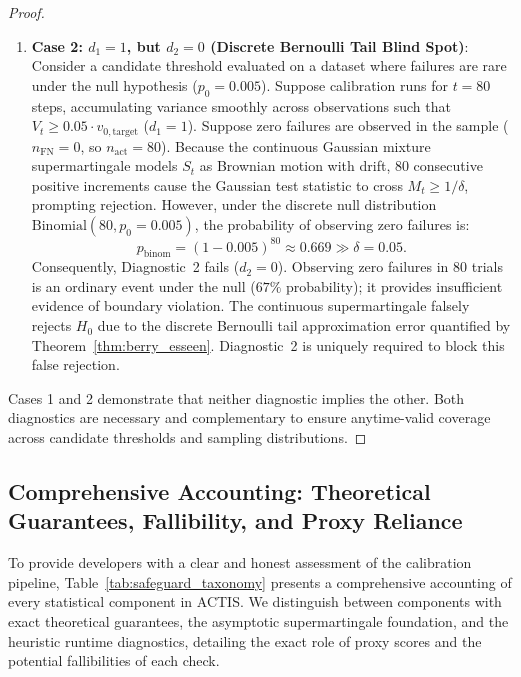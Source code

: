 \documentclass[11pt,a4paper]{article}
\begin{document}
\begin{proof}
\begin{enumerate}[leftmargin=*]
    \item \textbf{Case 2: $d_1 = 1$, but $d_2 = 0$ (Discrete Bernoulli Tail Blind Spot)}:
    Consider a candidate threshold evaluated on a dataset where failures are rare under the null hypothesis ($p_0 = 0.005$).
    Suppose calibration runs for $t = 80$ steps, accumulating variance smoothly across observations such that $V_t \ge 0.05 \cdot v_{0, \text{target}}$ ($d_1 = 1$).
    Suppose zero failures are observed in the sample ($n_{\text{FN}} = 0$, so $n_{\text{act}} = 80$).
    Because the continuous Gaussian mixture supermartingale models $S_t$ as Brownian motion with drift, 80 consecutive positive increments cause the Gaussian test statistic to cross $M_t \ge 1/\delta$, prompting rejection.
    However, under the discrete null distribution $\text{Binomial}(80, p_0 = 0.005)$, the probability of observing zero failures is:
    \begin{equation}
    p_{\text{binom}} = (1 - 0.005)^{80} \approx 0.669 \gg \delta = 0.05.
    \end{equation}
    Consequently, Diagnostic~2 fails ($d_2 = 0$).
    Observing zero failures in 80 trials is an ordinary event under the null ($67\%$ probability); it provides insufficient evidence of boundary violation. The continuous supermartingale falsely rejects $H_0$ due to the discrete Bernoulli tail approximation error quantified by Theorem~\ref{thm:berry_esseen}. Diagnostic~2 is uniquely required to block this false rejection.
\end{enumerate}
Cases 1 and 2 demonstrate that neither diagnostic implies the other. Both diagnostics are necessary and complementary to ensure anytime-valid coverage across candidate thresholds and sampling distributions.
\end{proof}

\subsection{Comprehensive Accounting: Theoretical Guarantees, Fallibility, and Proxy Reliance}\label{sec:safeguard_taxonomy}
To provide developers with a clear and honest assessment of the calibration pipeline, Table~\ref{tab:safeguard_taxonomy} presents a comprehensive accounting of every statistical component in ACTIS. We distinguish between components with exact theoretical guarantees, the asymptotic supermartingale foundation, and the heuristic runtime diagnostics, detailing the exact role of proxy scores and the potential fallibilities of each check.
\end{document}
